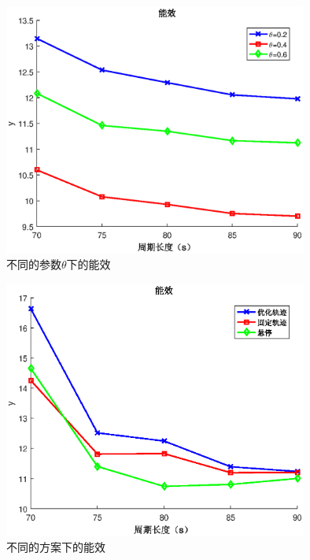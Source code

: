 \begin{figure}[H]
\centering
\includegraphics[width=10cm]{figures//chap4//不同的参数theta下的能效.eps}
\caption{不同的参数$\theta$下的能效}
\label{不同的参数theta下的能效}
\end{figure}



\begin{figure}[H]
\centering
\includegraphics[width=10cm]{figures//chap4//不同的方案下的能效.eps}
\caption{不同的方案下的能效}
\label{不同的方案下的能效}
\end{figure}

